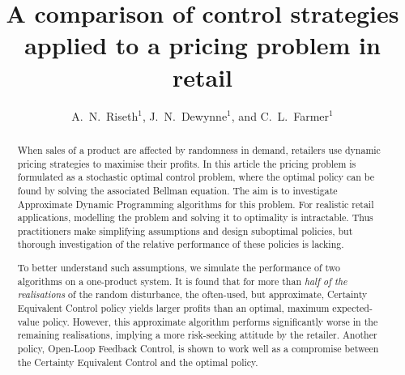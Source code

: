 \documentclass{rsproca_new}
\theoremstyle{definition}
\begin{document}
\title{A comparison of control strategies applied to a
  pricing problem in retail}

\author{A.~N.~Riseth$^{1}$, J.~N.~Dewynne$^{1}$, and C.~L.~Farmer$^{1}$}
\address{$^{1}$Mathematical Institute, University of Oxford, OX2 6GG.}

\subject{applied mathematics, revenue management}



\begin{abstract}
  When sales of a product are affected by randomness in demand,
  retailers use dynamic pricing strategies to maximise their
  profits. In this article the pricing problem is formulated as a
  stochastic optimal control problem, where the optimal policy can be
  found by solving the associated Bellman equation. The aim is to
  investigate Approximate Dynamic Programming algorithms for this
  problem. For realistic retail applications, modelling the problem
  and solving it to optimality is intractable. Thus practitioners make
  simplifying assumptions and design suboptimal policies, but thorough
  investigation of the relative performance of these policies is
  lacking.

  To better understand such assumptions, we simulate the performance
  of two algorithms on a one-product system. It is found that for more
  than \emph{half of the realisations} of the random disturbance, the
  often-used, but approximate, Certainty Equivalent Control
  policy yields larger profits than an optimal, maximum expected-value
  policy. However, this approximate algorithm performs significantly
  worse in the remaining realisations, implying a more risk-seeking
  attitude by the retailer. Another policy, Open-Loop Feedback
  Control, is shown to work well as a compromise between the Certainty
  Equivalent Control and the optimal policy.
\end{abstract}

\maketitle

\end{document}
